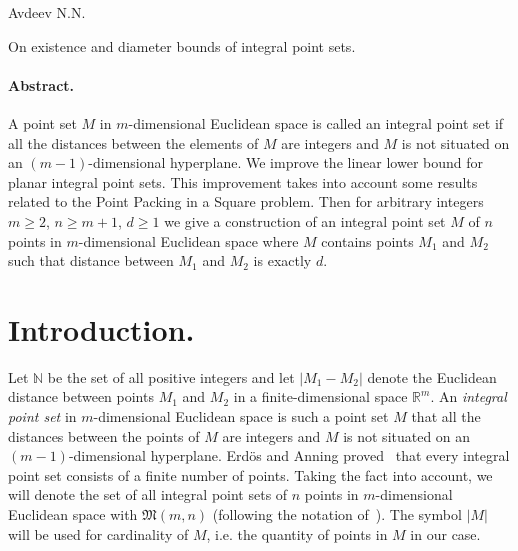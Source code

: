\documentclass[a4paper,14pt]{article} %
\theoremstyle{plain}
\begin{document}
\renewcommand{\bibname}{Список цитированной литературы}
\renewcommand\refname{\bibname}

Avdeev N.N.

On existence and diameter bounds of integral point sets.

\paragraph{Abstract.}
A point set $M$ in $m$-dimensional Euclidean space is called an integral point set if all the distances between the
elements of $M$ are integers and $M$ is not situated on an $(m-1)$-dimensional hyperplane.
We improve the linear lower bound for planar integral point sets.
This improvement takes into account some results related to the Point Packing in a Square problem.
Then for arbitrary integers $m \geq 2$, $n \geq m+1$, $d \geq 1$
we give a construction of an integral point set $M$ of $n$ points in $m$-dimensional Euclidean space
where $M$ contains points $M_1$ and $M_2$ such that distance between $M_1$ and $M_2$ is exactly $d$.



\section{Introduction.}
Let $\mathbb{N}$ be the set of all positive integers and let $|M_1 - M_2|$ denote the Euclidean distance
between points $M_1$ and $M_2$ in a finite-dimensional space $\mathbb{R}^m$.
An \textit{integral point set} in $m$-dimensional Euclidean space is such a point set $M$ that all the distances between the
points of $M$ are integers and $M$ is not situated on an $(m-1)$-dimensional hyperplane.
Erd\"os and Anning proved~\cite{anning1945integral,erdos1945integral} that every integral point set consists of a finite number of points.
Taking the fact into account, we will denote the set of all integral point sets of $n$ points in $m$-dimensional Euclidean space with
$\mathfrak{M}(m,n)$ (following the notation of~\cite{our-vmmsh-2018}).
The symbol $|M|$ will be used for cardinality of $M$, i.e. the quantity of points in $M$ in our case.
\end{document}

